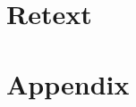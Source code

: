 \pagestyle{scrheadings}
\cleardoublepage

\cleardoublepage\part{Retext}

\glsresetall


\cleardoublepage

\appendix
\cleardoublepage\part{Appendix}





\cleardoublepage
\cleardoublepage


